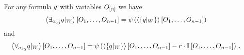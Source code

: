 \begin{theorem}
	For any formula $q$ with variables $O_{[n]}$ we have
		\begin{align}
			\left({\exists_{a_{o_{0}}}  q}|_{W}\right)[O_{1},\ldots,O_{n-1}] = 
			\psi\left(
			\left\langle \left\{{q}|_{W}\right\}\right\rangle \left[ O_{1},\ldots,O_{n-1} \right]
			\right)
		\end{align}
	and
		\begin{align}
			\left({\forall_{a_{o_{0}}} q}|_{W}\right)[O_{1},\ldots,O_{n-1}] = 
			\psi\left(
			\left\langle \left\{{q}|_{W}\right\}\right\rangle \left[ O_{1},\ldots,O_{n-1} \right]
			- r \cdot \mathbb{I}\left[O_{1},\ldots,O_{n-1}\right]
			\right) \, . 
		\end{align}
\end{theorem}
